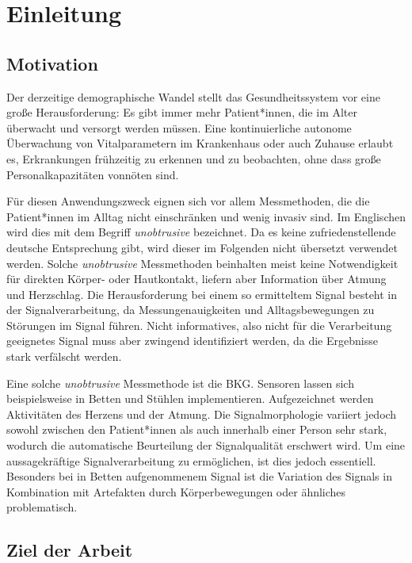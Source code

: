 \chapter{Einleitung}\label{einleitung}

\section{Motivation}

Der derzeitige demographische Wandel stellt das Gesundheitssystem vor eine große Herausforderung: Es gibt immer mehr Patient*innen, die im Alter überwacht und versorgt werden müssen. Eine kontinuierliche autonome Überwachung von Vitalparametern im Krankenhaus oder auch Zuhause erlaubt es, Erkrankungen frühzeitig zu erkennen und zu beobachten, ohne dass große Personalkapazitäten vonnöten sind.

Für diesen Anwendungszweck eignen sich vor allem Messmethoden, die die Patient*innen im Alltag nicht einschränken und wenig invasiv sind. Im Englischen wird dies mit dem Begriff \textit{unobtrusive} bezeichnet. Da es keine zufriedenstellende deutsche Entsprechung gibt, wird dieser im Folgenden nicht übersetzt verwendet werden. Solche \textit{unobtrusive} Messmethoden beinhalten meist keine Notwendigkeit für direkten Körper- oder Hautkontakt, liefern aber Information über Atmung und Herzschlag. Die Herausforderung bei einem so ermitteltem Signal besteht in der Signalverarbeitung, da Messungenauigkeiten und Alltagsbewegungen zu Störungen im Signal führen. Nicht informatives, also nicht für die Verarbeitung geeignetes Signal muss aber zwingend identifiziert werden, da die Ergebnisse stark verfälscht werden.

Eine solche \textit{unobtrusive} Messmethode ist die \acf{BKG}. Sensoren lassen sich beispielsweise in Betten und Stühlen implementieren. Aufgezeichnet werden Aktivitäten des Herzens und der Atmung. Die Signalmorphologie variiert jedoch sowohl zwischen den Patient*innen als auch innerhalb einer Person sehr stark, wodurch die automatische Beurteilung der Signalqualität erschwert wird. Um eine aussagekräftige Signalverarbeitung zu ermöglichen, ist dies jedoch essentiell. Besonders bei in Betten aufgenommenem Signal ist die Variation des Signals in Kombination mit Artefakten durch Körperbewegungen oder ähnliches problematisch.  
 

\section{Ziel der Arbeit}

